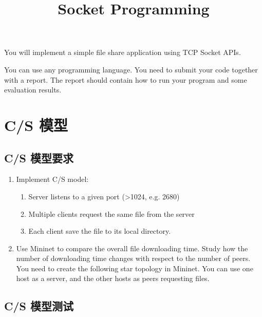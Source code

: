 \endofdump

\title{Socket Programming}
\maketitle
\tableofcontents

\vfill
You will implement a simple file share application using TCP Socket APIs. 

You can use any programming language. You need to submit your code together with a report. The report should contain how to run your program and some evaluation results.
\vfill
\clearpage
\section{C/S 模型}

\subsection{C/S 模型要求}

\begin{enumerate}
    \item Implement C/S model: 
    \begin{enumerate}
        \item Server listens to a given port (>1024, e.g. 2680)
        \item Multiple clients request the same file from the server
        \item Each client save the file to its local directory.
    \end{enumerate}
    \item Use Mininet to compare the overall file downloading time. Study how the number of downloading time changes with respect to the number of peers. You need to create the following star topology in Mininet. You can use one host as a server, and the other hosts as peers requesting files.
    \begin{figure}[H]
        \centering
        
    \end{figure}
\end{enumerate}

\subsection{C/S 模型测试}


